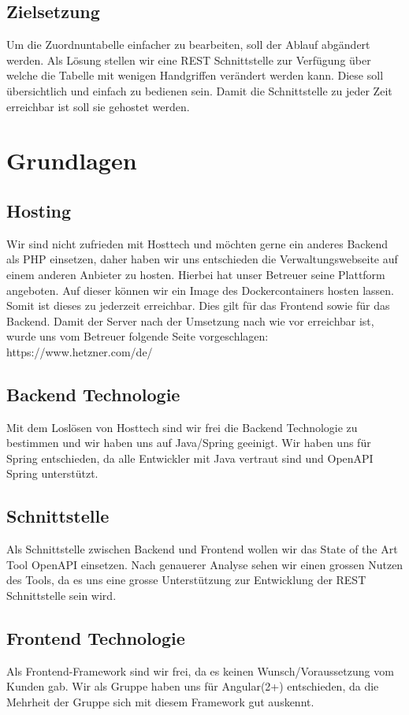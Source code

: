 \documentclass[a4paper]{article}
\begin{document}
	\subsection{Zielsetzung}
	Um die Zuordnuntabelle einfacher zu bearbeiten, soll der Ablauf abgändert werden. Als Lösung stellen wir eine REST Schnittstelle zur Verfügung über welche die Tabelle mit wenigen Handgriffen verändert werden kann. 
	Diese soll übersichtlich und einfach zu bedienen sein. Damit die Schnittstelle zu jeder Zeit erreichbar ist soll sie gehostet werden.
	
	\section{Grundlagen}
	
	\subsection{Hosting}
	Wir sind nicht zufrieden mit Hosttech und möchten gerne ein anderes Backend als PHP einsetzen, daher haben wir uns entschieden die Verwaltungswebseite auf einem anderen Anbieter zu hosten. 
	Hierbei hat unser Betreuer seine Plattform angeboten. Auf dieser können wir ein Image des Dockercontainers hosten lassen. Somit ist dieses zu jederzeit erreichbar. Dies gilt für das Frontend sowie für das Backend.
	Damit der Server nach der Umsetzung nach wie vor erreichbar ist, wurde uns vom Betreuer folgende Seite vorgeschlagen: https://www.hetzner.com/de/
	
	\subsection{Backend Technologie}
	Mit dem Loslösen von Hosttech sind wir frei die Backend Technologie zu bestimmen und wir haben uns auf Java/Spring geeinigt. Wir haben uns für Spring entschieden, da alle Entwickler mit Java vertraut sind und OpenAPI Spring unterstützt. 
	
	\subsection{Schnittstelle}
	Als Schnittstelle zwischen Backend und Frontend wollen wir das State of the Art Tool OpenAPI einsetzen. Nach genauerer Analyse sehen wir einen grossen Nutzen des Tools, da es uns eine grosse Unterstützung zur Entwicklung der REST Schnittstelle sein wird. 
	
	\subsection{Frontend Technologie}
	Als Frontend-Framework sind wir frei, da es keinen Wunsch/Voraussetzung vom Kunden gab.
	Wir als Gruppe haben uns für Angular(2+) entschieden, da die Mehrheit der Gruppe sich mit diesem Framework gut auskennt. 
	
\end{document}
